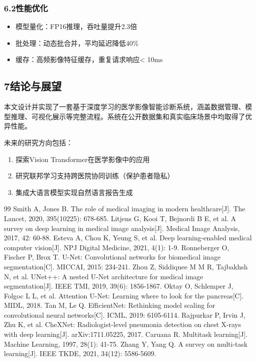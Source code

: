 \documentclass{harryopo-paper}
\begin{document}
\subsubsection*{6.2性能优化}

\begin{itemize}
  \item {\fzht 模型量化}：FP16推理，吞吐量提升2.3倍
  \item {\fzht 批处理}：动态批合并，平均延迟降低40\%
  \item {\fzht 缓存}：高频影像特征缓存，重复请求响应< 10ms
\end{itemize}

\subsection*{7结论与展望}

本文设计并实现了一套基于深度学习的医学影像智能诊断系统，涵盖数据管理、模型推理、可视化展示等完整流程。系统在公开数据集和真实临床场景中均取得了优异性能。

未来的研究方向包括：

\begin{enumerate}
  \item 探索Vision Transformer在医学影像中的应用
  \item 研究联邦学习支持跨医院协同训练（保护患者隐私）
  \item 集成大语言模型实现自然语言报告生成
\end{enumerate}

\begin{thebibliography}{99}
 Smith A, Jones B. The role of medical imaging in modern healthcare[J]. The Lancet, 2020, 395(10225): 678-685.
 Litjens G, Kooi T, Bejnordi B E, et al. A survey on deep learning in medical image analysis[J]. Medical Image Analysis, 2017, 42: 60-88.
 Esteva A, Chou K, Yeung S, et al. Deep learning-enabled medical computer vision[J]. NPJ Digital Medicine, 2021, 4(1): 1-9.
 Ronneberger O, Fischer P, Brox T. U-Net: Convolutional networks for biomedical image segmentation[C]. MICCAI, 2015: 234-241.
 Zhou Z, Siddiquee M M R, Tajbakhsh N, et al. UNet++: A nested U-Net architecture for medical image segmentation[J]. IEEE TMI, 2019, 39(6): 1856-1867.
 Oktay O, Schlemper J, Folgoc L L, et al. Attention U-Net: Learning where to look for the pancreas[C]. MIDL, 2018.
 Tan M, Le Q. EfficientNet: Rethinking model scaling for convolutional neural networks[C]. ICML, 2019: 6105-6114.
 Rajpurkar P, Irvin J, Zhu K, et al. CheXNet: Radiologist-level pneumonia detection on chest X-rays with deep learning[J]. arXiv:1711.05225, 2017.
 Caruana R. Multitask learning[J]. Machine Learning, 1997, 28(1): 41-75.
 Zhang Y, Yang Q. A survey on multi-task learning[J]. IEEE TKDE, 2021, 34(12): 5586-5609.
\end{thebibliography}
\end{document}
